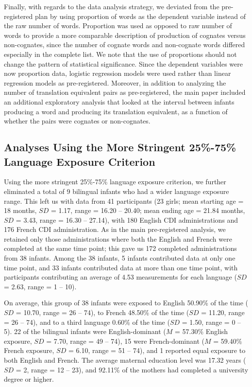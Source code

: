 \documentclass[
  ,man,floatsintext]{apa6}
\begin{document}
Finally, with regards to the data analysis strategy, we deviated from the pre-registered plan by using proportion of words as the dependent variable instead of the raw number of words. Proportion was used as opposed to raw number of words to provide a more comparable description of production of cognates versus non-cognates, since the number of cognate words and non-cognate words differed especially in the complete list. We note that the use of proportions should not change the pattern of statistical significance. Since the dependent variables were now proportion data, logistic regression models were used rather than linear regression models as pre-registered. Moreover, in addition to analyzing the number of translation equivalent pairs as pre-registered, the main paper included an additional exploratory analysis that looked at the interval between infants producing a word and producing its translation equivalent, as a function of whether the pairs were cognates or non-cognates.

\hypertarget{analyses-using-the-more-stringent-25-75-language-exposure-criterion}{%
\subsection{Analyses Using the More Stringent 25\%-75\% Language Exposure Criterion}\label{analyses-using-the-more-stringent-25-75-language-exposure-criterion}}

Using the more stringent 25\%-75\% language exposure criterion, we further eliminated a total of 9 bilingual infants who had a wider language exposure range. This left us with data from 41 participants (23 girls; mean starting age = 18 months, \(SD\) = 1.17, range = 16.20 -- 20.40; mean ending age = 21.84 months, \(SD\) = 3.43, range = 16.30 -- 27.14), with 180 English CDI administrations and 176 French CDI administration. As in the main pre-registered analysis, we retained only those administrations where both the English and French were completed at the same time point; this gave us 172 completed administrations from 38 infants. Among the 38 infants, 5 infants contributed data at only one time point, and 33 infants contributed data at more than one time point, with participants contributing an average of 4.53 measurements for each language (\(SD\) = 2.63, range = 1 -- 10).

On average, this group of 38 infants were exposed to English 50.90\% of the time (\(SD\) = 10.70, range = 26 -- 74), to French 48.50\% of the time (\(SD\) = 11.20, range = 26 -- 74), and to a third language 0.60\% of the time (\(SD\) = 1.50, range = 0 -- 5). 22 of the bilingual infants were English-dominant (\(M\) = 57.30\% English exposure, \(SD\) = 7.70, range = 49 -- 74), 15 were French-dominant (\(M\) = 59.40\% French exposure, \(SD\) = 6.10, range = 51 -- 74), and 1 reported equal exposure to both English and French. The average maternal education level was 17.32 years (\(SD\) = 2, range = 12 -- 23), and 92.11\% of the mothers had completed a university degree or higher.
\end{document}

